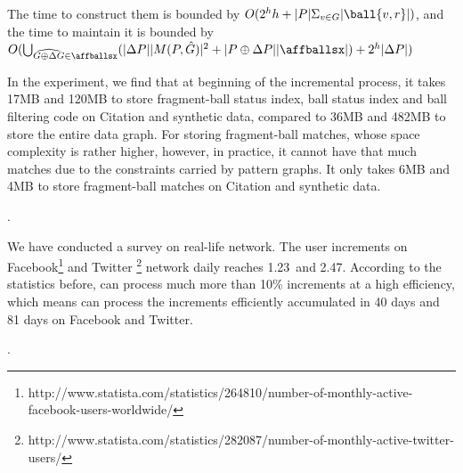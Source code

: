 The time to construct them is bounded by $O(2^{h}h+|P|\Sigma_{v\in G}|\ball{v, r}|)$, and the time to maintain it is bounded by $O(\bigcup_{\widehat{G\oplus\Delta G}\in \affballsx}(|\Delta P||M(P, \hat{G})|^2 + |P \oplus \Delta P||\affballsx|)+2^h|\Delta P|)$


In the experiment, we find that at beginning of the incremental process, it takes 17MB and 120MB to store fragment-ball status index, ball status index and ball filtering code on Citation and synthetic data, compared to 36MB and 482MB to store the entire data graph. For storing fragment-ball matches, whose space complexity is rather higher, however, in practice, it cannot have that much matches due to the constraints carried by pattern graphs. It only takes 6MB and 4MB to store fragment-ball matches on Citation and synthetic data.



.

We have conducted a survey on real-life network. The user increments on Facebook\footnote{\small http://www.statista.com/statistics/264810/number-of-monthly-active-facebook-users-worldwide/} and Twitter \footnote{\small http://www.statista.com/statistics/282087/number-of-monthly-active-twitter-users/} network daily reaches 1.23\textperthousand\ and 2.47\textperthousand. According to the statistics before, \datainc can process much more than 10\% increments at a high efficiency, which means \datainc can process the increments efficiently accumulated in 40 days and 81 days on Facebook and Twitter.


.

